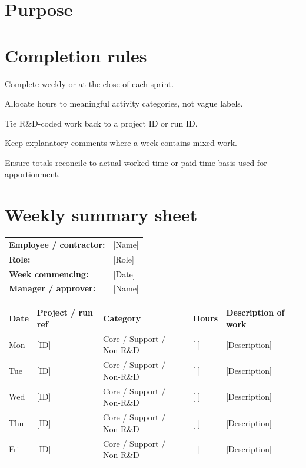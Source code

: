 \documentclass[11pt]{article}
\begin{document}
\RDTitlePage
\tableofcontents
\clearpage

\section{Purpose}

\section{Completion rules}
\begin{RDChecklist}
\item Complete weekly or at the close of each sprint.
\item Allocate hours to meaningful activity categories, not vague labels.
\item Tie R\&D-coded work back to a project ID or run ID.
\item Keep explanatory comments where a week contains mixed work.
\item Ensure totals reconcile to actual worked time or paid time basis used for apportionment.
\end{RDChecklist}

\section{Weekly summary sheet}
\begin{tabularx}{\textwidth}{@{}L{4.2cm}Y@{}}
\textbf{Employee / contractor:} & {[Name]} \\
\textbf{Role:} & {[Role]} \\
\textbf{Week commencing:} & {[Date]} \\
\textbf{Manager / approver:} & {[Name]} \\
\end{tabularx}

\begin{xltabular}{\textwidth}{L{1.8cm}L{2.5cm}L{2.3cm}C{1.5cm}Y}
\textbf{Date} & \textbf{Project / run ref} & \textbf{Category} & \textbf{Hours} & \textbf{Description of work} \\
Mon & [ID] & Core / Support / Non-R\&D & [ ] & [Description] \\
Tue & [ID] & Core / Support / Non-R\&D & [ ] & [Description] \\
Wed & [ID] & Core / Support / Non-R\&D & [ ] & [Description] \\
Thu & [ID] & Core / Support / Non-R\&D & [ ] & [Description] \\
Fri & [ID] & Core / Support / Non-R\&D & [ ] & [Description] \\
\end{xltabular}
\end{document}
